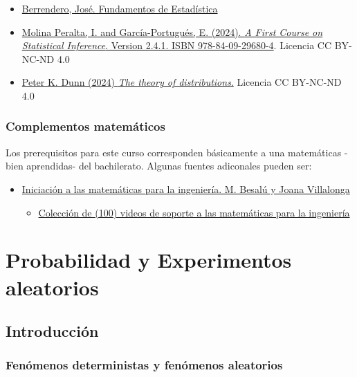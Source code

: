 \documentclass[
]{article}
\providecommand{\tightlist}{%
  \setlength{\itemsep}{0pt}\setlength{\parskip}{0pt}}
\begin{document}
\begin{itemize}
\item
  \href{https://verso.mat.uam.es/~joser.berrendero/libro-est/}{Berrendero, José. Fundamentos de Estadística}
\item
  \href{https://bookdown.org/egarpor/inference/}{Molina Peralta, I. and García-Portugués, E. (2024). \emph{A First Course on Statistical Inference}. Version 2.4.1. ISBN 978-84-09-29680-4}. Licencia CC BY-NC-ND 4.0
\item
  \href{https://bookdown.org/pkaldunn/DistTheory}{Peter K. Dunn (2024) \emph{The theory of distributions}.} Licencia CC BY-NC-ND 4.0
\end{itemize}

\subsubsection*{Complementos matemáticos}\label{complementos-matemuxe1ticos}

Los prerequisitos para este curso corresponden básicamente a una matemáticas -bien aprendidas- del bachilerato. Algunas fuentes adiconales pueden ser:

\begin{itemize}
\item
  \href{http://cimanet.uoc.edu/cursMates0/IniciacionMatematicas/pdf/PID_00273914.pdf}{Iniciación a las matemáticas para la ingeniería. M. Besalú y Joana Villalonga}

  \begin{itemize}
  \tightlist
  \item
    \href{https://www.youtube.com/playlist?list=PLv8FweHfYYMo6Lr2zt6H4znq5KuBacq28}{Colección de (100) videos de soporte a las matemáticas para la ingeniería}
  \end{itemize}
\end{itemize}

\section{Probabilidad y Experimentos aleatorios}\label{probabilidad-y-experimentos-aleatorios}

\subsection{Introducción}\label{introducciuxf3n}

\subsubsection{Fenómenos deterministas y fenómenos aleatorios}\label{fenuxf3menos-deterministas-y-fenuxf3menos-aleatorios}
\end{document}
